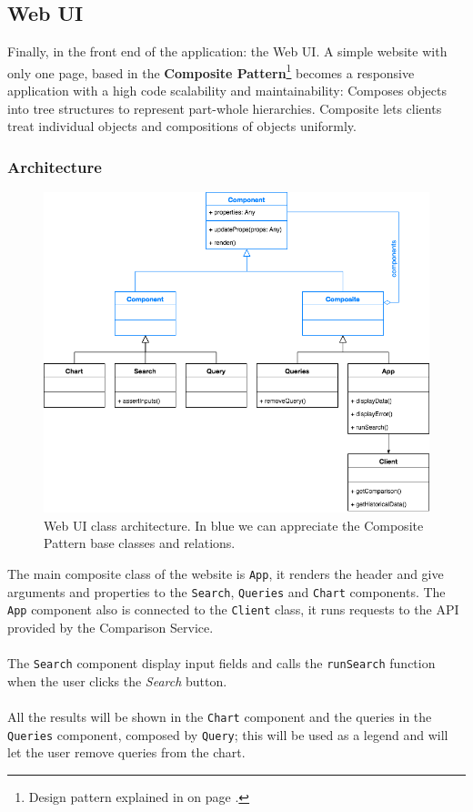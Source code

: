 

\subsection{Web UI} \label{web-ui}

Finally, in the front end of the application: the Web UI. A simple website with only one page, based in the \textbf{Composite Pattern}\footnote{Design pattern explained in  on page \pageref{appendix_b}.} becomes a responsive application with a high code scalability and maintainability: Composes objects into tree structures to represent part-whole hierarchies. Composite lets clients treat individual objects and compositions of objects uniformly.

\subsubsection*{Architecture}

\begin{figure}[H]
\centering
\includegraphics[scale=0.5]{diagrams/web-ui-architecture.png}
\caption{Web UI class architecture. In blue we can appreciate the Composite Pattern base classes and relations.}
\end{figure}

The main composite class of the website is \texttt{App}, it renders the header and give arguments and properties to the \texttt{Search}, \texttt{Queries} and \texttt{Chart} components. The \texttt{App} component also is connected to the \texttt{Client} class, it runs requests to the API provided by the Comparison Service.
\\\\
The \texttt{Search} component display input fields and calls the \texttt{runSearch} function when the user clicks the \textit{Search} button.
\\\\
All the results will be shown in the \texttt{Chart} component and the queries in the \texttt{Queries} component, composed by \texttt{Query}; this will be used as a legend and will let the user remove queries from the chart.

